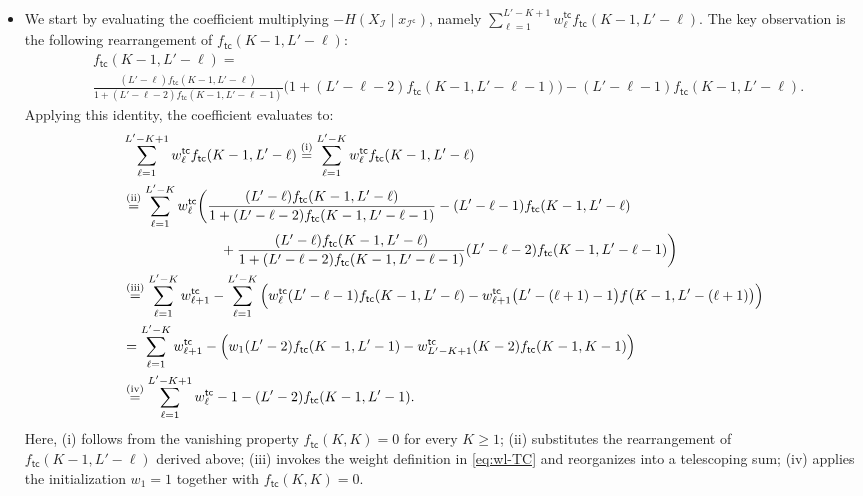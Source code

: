 \documentclass[english]{article}
\newcommand{\cI}{\mathcal{I}}
\newcommand{\numpf}[2]{\overset{(\mathrm{#1})}{#2}}
\newcommand{\tc}{\mathsf{tc}}
\begin{document}
\begin{itemize}
    \item 

We start by evaluating the coefficient multiplying $-H(X_{\cI} \mid x_{\cI^\mathsf{c}})$, namely $\sum_{\ell = 1}^{L'-K+1} w^\tc_{\ell} f_\tc(K-1, L'-\ell)$. The key observation is the following rearrangement of $f_\tc(K-1, L'-\ell)$:
\begin{align*}
&f_\tc(K-1, L'-\ell) = \\
&\frac{(L'-\ell)f_\tc(K-1, L'-\ell)}{1 + (L'-\ell-2)f_\tc(K-1, L'-\ell-1)} \Big(1 + (L'-\ell-2)f_\tc(K-1, L'-\ell-1) \Big) - (L'-\ell-1)f_\tc(K-1, L'-\ell) .
\end{align*}
Applying this identity, the coefficient evaluates to:
\begin{align}
    &\sum_{\ell = 1}^{L'-K+1} w^\tc_{\ell} f_\tc(K-1, L'-\ell) \numpf{i}{=} \sum_{\ell = 1}^{L'-K} w^\tc_{\ell} f_\tc(K-1, L'-\ell) \notag\\
    &\numpf{ii}{=} \sum_{\ell = 1}^{L'-K} w^\tc_{\ell}\bigg( \frac{(L'-\ell)f_\tc(K-1, L'-\ell)}{1 + (L'-\ell-2)f_\tc(K-1, L'-\ell-1)} - (L'-\ell-1)f_\tc(K-1, L'-\ell) \notag\\
    &\qquad \qquad\qquad\quad + \frac{(L'-\ell)f_\tc(K-1, L'-\ell)}{1 + (L'-\ell-2)f_\tc(K-1, L'-\ell-1)}(L'-\ell-2)f_\tc(K-1, L'-\ell-1)\bigg) \notag\\
    &\numpf{iii}{=} \sum_{\ell = 1}^{L'-K} w^\tc_{\ell + 1} - \sum_{\ell = 1}^{L'-K} \Big( w^\tc_{\ell} (L'-\ell-1)f_\tc(K-1, L'-\ell) - w^\tc_{\ell + 1} \big(L'-(\ell + 1)-1\big)f\big(K-1, L'-(\ell + 1)\big) \Big) \notag\\
    &= \sum_{\ell = 1}^{L'-K} w^\tc_{\ell + 1} - \Big(w_1 (L'-2)f_\tc(K-1, L'-1) - w^\tc_{L'-K+1} (K-2)f_\tc(K-1, K-1) \Big) \notag\\
    &\numpf{iv}{=} \sum_{\ell = 1}^{L'-K+1} w^\tc_{\ell} -1 - (L'-2)f_\tc(K-1,L'-1).\label{eq:coeff-TC-all}
\end{align}
Here, (i) follows from the vanishing property $f_\tc(K,K)=0$ for every $K\geq 1$; (ii) substitutes the rearrangement of $f_\tc(K-1, L'-\ell)$ derived above;
(iii) invokes the weight definition in \eqref{eq:wl-TC} and reorganizes into a telescoping sum; (iv) applies the initialization $ w_1 = 1 $ together with $f_\tc(K,K)=0$.


\end{itemize}
\end{document}
